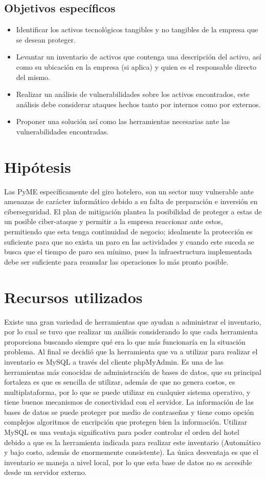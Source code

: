 \documentclass[10pt]{article}
\begin{document}
\subsection{Objetivos específicos}
\begin{itemize}
    \item Identificar los activos tecnológicos tangibles y no tangibles de la empresa que se desean proteger.
    \item Levantar un inventario de activos que contenga una descripción del activo, así como su ubicación en la empresa (si aplica) y quien es el responsable directo del mismo.
    \item Realizar un análisis de vulnerabilidades sobre los activos encontrados, este análisis debe considerar ataques hechos tanto por internos como por externos.
    \item Proponer una solución así como las herramientas necesarias ante las vulnerabilidades encontradas.
\end{itemize}

\section{Hipótesis}

Las PyME específicamente del giro hotelero, son un sector muy vulnerable ante amenazas de carácter informático debido a su falta de preparación e inversión en ciberseguridad. El plan de mitigación plantea la posibilidad de proteger a estas de un posible ciber-ataque y permitir a la empresa reaccionar ante estos, permitiendo que esta tenga continuidad de negocio; idealmente la protección es suficiente para que no exista un paro en las actividades y cuando este suceda se busca que el tiempo de paro sea mínimo, pues la infraestructura implementada debe ser suficiente para reanudar las operaciones lo más pronto posible. 

\section{Recursos utilizados}
Existe una gran variedad de herramientas que ayudan a administrar el inventario, por lo cual se tuvo que realizar un análisis considerando lo que cada herramienta proporciona buscando siempre qué era lo que más funcionaría en la situación problema. Al final se decidió que la herramienta que va a utilizar para realizar el inventario es MySQL a través del cliente phpMyAdmin. Es una de las herramientas más conocidas de administración de bases de datos, que su principal fortaleza es que es sencilla de utilizar, además de que no genera costos, es multiplataforma, por lo que se puede utilizar en cualquier sistema operativo, y tiene buenos mecanismos de conectividad con el servidor. La información de las bases de datos se puede proteger por medio de contraseñas y tiene como opción complejos algoritmos de encripción que protegen bien la información. Utilizar MySQL es una ventaja significativa para poder controlar el orden del hotel debido a que es la herramienta indicada para realizar este inventario (Automático y bajo costo, además de enormemente consistente). La única desventaja es que el inventario se maneja a nivel local, por lo que esta base de datos no es accesible desde un servidor externo. 
\end{document}
